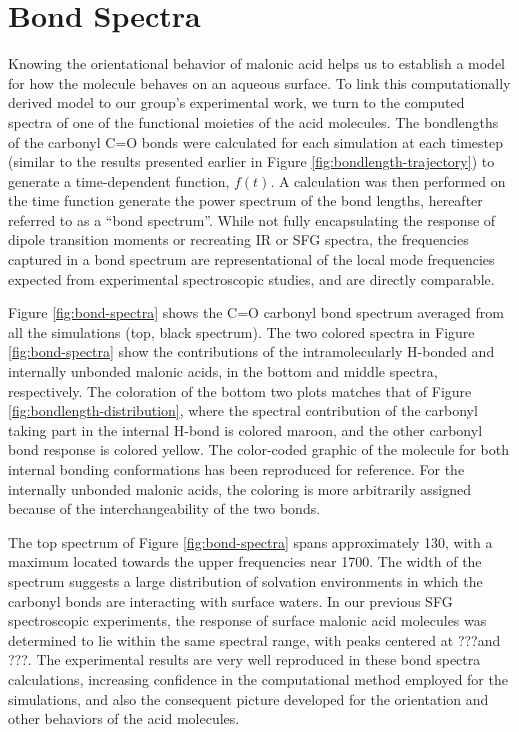 \section {Bond Spectra}

Knowing the orientational behavior of malonic acid helps us to establish a model for how the molecule behaves on an aqueous surface. To link this computationally derived model to our group's experimental work, we turn to the computed spectra of one of the functional moieties of the acid molecules. The bondlengths of the carbonyl C=O bonds were calculated for each simulation at each timestep (similar to the results presented earlier in Figure \ref{fig:bondlength-trajectory}) to generate a time-dependent function, $f(t)$. A calculation was then performed on the time function generate the power spectrum of the bond lengths,\cite{BuchPaper,Etc} hereafter referred to as a ``bond spectrum''. While not fully encapsulating the response of dipole transition moments or recreating IR or SFG spectra, the frequencies captured in a bond spectrum are representational of the local mode frequencies expected from experimental spectroscopic studies, and are directly comparable.

Figure \ref{fig:bond-spectra} shows the C=O carbonyl bond spectrum averaged from all the simulations (top, black spectrum). The two colored spectra in Figure \ref{fig:bond-spectra} show the contributions of the intramolecularly H-bonded and internally unbonded malonic acids, in the bottom and middle spectra, respectively. The coloration of the bottom two plots matches that of Figure \ref{fig:bondlength-distribution}, where the spectral contribution of the carbonyl taking part in the internal H-bond is colored maroon, and the other carbonyl bond response is colored yellow. The color-coded graphic of the molecule for both internal bonding conformations has been reproduced for reference. For the internally unbonded malonic acids, the coloring is more arbitrarily assigned because of the interchangeability of the two bonds.

The top spectrum of Figure \ref{fig:bond-spectra} spans approximately 130\cm, with a maximum located towards the upper frequencies near 1700\cm. The width of the spectrum suggests a large distribution of solvation environments in which the carbonyl bonds are interacting with surface waters. In our previous SFG spectroscopic experiments, the response of surface malonic acid molecules was determined to lie within the same spectral range, with peaks centered at ???\cm and ???\cm. The experimental results are very well reproduced in these bond spectra calculations, increasing confidence in the computational method employed for the simulations, and also the consequent picture developed for the orientation and other behaviors of the acid molecules.

